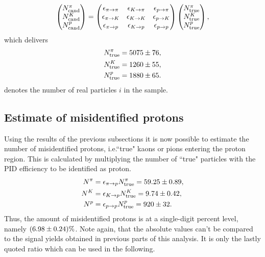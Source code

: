 \begin{align*}
    \begin{pmatrix} 
        N_{\text{cand}}^{\pi} \\ N_{\text{cand}}^{{K}} \\ N_{\text{cand}}^{{p}}
    \end{pmatrix}
    =
    \begin{pmatrix}
       \epsilon_{{\pi}\rightarrow{\pi}}     & \epsilon_{{{K}}\rightarrow{\pi}}     & \epsilon_{{{p}}\rightarrow{\pi}} \\
       \epsilon_{{\pi}\rightarrow{{\ensuremath{K}}}}   & \epsilon_{{{K}}\rightarrow{{\ensuremath{K}}}}   & \epsilon_{{{p}}\rightarrow{{\ensuremath{K}}}} \\
       \epsilon_{{\pi}\rightarrow{{\ensuremath{p}}}} & \epsilon_{{{K}}\rightarrow{{\ensuremath{p}}}} & \epsilon_{{{p}}\rightarrow{{\ensuremath{p}}}} 
    \end{pmatrix}
    \begin{pmatrix} 
        N_{\text{true}}^{\pi} \\ N_{\text{true}}^{{K}} \\ N_{\text{true}}^{{p} }
    \end{pmatrix},
\end{align*}
which delivers
\begin{align}
    N_{\text{true}}^{\pi}     &= 5075 \pm 76, \\ 
    N_{\text{true}}^{{K}}   &= 1260 \pm 55, \\ 
    N_{\text{true}}^{{p}} &= 1880 \pm 65.
\end{align}
 denotes the number of real particles $i$ in the sample.

\subsection{Estimate of misidentified protons}
Using the results of the previous subsections it is now possible to estimate the number of misidentified protons, i.e.``true" kaons or pions entering the proton region.
This is calculated by multiplying the number of ``true" particles  with the PID efficiency  to be identified as proton. 
\begin{align}
    N^{\pi}     &= \epsilon_{{\pi}\rightarrow{{\ensuremath{p}}}} N_{\text{true}}^{\pi}         = 59.25 \pm 0.89, \\  
    N^{{K}}   &= \epsilon_{{{K}}\rightarrow{{\ensuremath{p}}}} N_{\text{true}}^{{K}}     = 9.74 \pm 0.42, \\ 
    N^{{p}} &= \epsilon_{{{p}}\rightarrow{{\ensuremath{p}}}} N_{\text{true}}^{{p}} = 920 \pm 32.
\end{align}
Thus, the amount of misidentified protons is at a single-digit percent level, namely $(6.98 \pm 0.24)\%$. 
Note again, that the absolute values can't be compared to the signal yields obtained in previous parts of this analysis.
It is only the lastly quoted ratio which can be used in the following.

